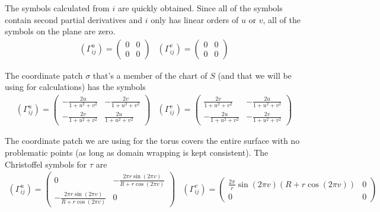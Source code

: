 \documentclass[12pt]{article}
\begin{document}
		The symbols calculated from $i$ are quickly obtained.
		Since all of the symbols contain second partial derivatives and $i$ only has linear orders of $u$ or $v$, all of the symbols on the plane are zero.
		\begin{equation}
			\begin{array}{lr}
				\left(\Gamma^{u}_{ij}\right) = \left( \begin{array}{cc}
					0 & 0 \\
					0 & 0
				\end{array} \right) &
				\left(\Gamma^{v}_{ij}\right) = \left( \begin{array}{cc}
					0 & 0 \\
					0 & 0
				\end{array} \right)
			\end{array}
		\end{equation}
		
		The coordinate patch $\sigma$ that's a member of the chart of $S$ (and that we will be using for calculations) has the symbols
		\begin{equation}
			\begin{array}{lr}
			\left(\Gamma^{u}_{ij}\right) = \left( \begin{array}{cc}
					-\frac{2u}{1+u^2+v^2} & -\frac{2v}{1+u^2+v^2} \\
					-\frac{2v}{1+u^2+v^2} & \frac{2u}{1+u^2+v^2}
				\end{array} \right) &
			\left(\Gamma^{v}_{ij}\right) = \left( \begin{array}{cc}
					\frac{2v}{1+u^2+v^2} & -\frac{2u}{1+u^2+v^2} \\
					-\frac{2u}{1+u^2+v^2} & -\frac{2v}{1+u^2+v^2}
				\end{array} \right)
			\end{array}
		\end{equation}
		
		The coordinate patch we are using for the torus covers the entire surface with no problematic points (as long as domain wrapping is kept consistent).
		The Christoffel symbols for $\tau$ are
		\begin{equation}
			\begin{array}{lr}
				\left(\Gamma^{u}_{ij}\right) = \left( \begin{array}{cc}
					0 & -\frac{2\pi r\sin(2\pi v)}{R+r\cos(2\pi v)} \\
					-\frac{2\pi r\sin(2\pi v)}{R+r\cos(2\pi v)} & 0
				\end{array} \right) &
				\left(\Gamma^{v}_{ij}\right) = \left( \begin{array}{cc}
					\frac{2\pi}{r}\sin(2\pi v)(R+r\cos(2\pi v)) & 0 \\
					0 & 0
				\end{array} \right)
			\end{array}
		\end{equation}
		
\end{document}
